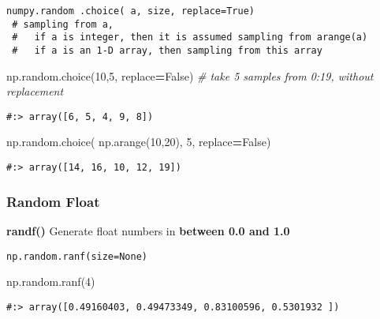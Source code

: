 \documentclass[
]{book}
\newenvironment{Shaded}{\begin{snugshade}}{\end{snugshade}}
\newcommand{\CommentTok}[1]{\textcolor[rgb]{0.37,0.37,0.37}{\textit{#1}}}
\newcommand{\DecValTok}[1]{\textcolor[rgb]{0.06,0.06,0.06}{#1}}
\newcommand{\NormalTok}[1]{#1}
\newcommand{\OperatorTok}[1]{\textcolor[rgb]{0.43,0.43,0.43}{\textbf{#1}}}
\newcommand{\VariableTok}[1]{\textcolor[rgb]{0,0,0}{#1}}
\begin{document}
\begin{verbatim}
numpy.random .choice( a, size, replace=True)
 # sampling from a, 
 #   if a is integer, then it is assumed sampling from arange(a)
 #   if a is an 1-D array, then sampling from this array
\end{verbatim}

\begin{Shaded}
\begin{Highlighting}[]
\NormalTok{np.random.choice(}\DecValTok{10}\NormalTok{,}\DecValTok{5}\NormalTok{, replace}\OperatorTok{=}\VariableTok{False}\NormalTok{) }\CommentTok{\# take 5 samples from 0:19, without replacement}
\end{Highlighting}
\end{Shaded}

\begin{verbatim}
#:> array([6, 5, 4, 9, 8])
\end{verbatim}

\begin{Shaded}
\begin{Highlighting}[]
\NormalTok{np.random.choice( np.arange(}\DecValTok{10}\NormalTok{,}\DecValTok{20}\NormalTok{), }\DecValTok{5}\NormalTok{, replace}\OperatorTok{=}\VariableTok{False}\NormalTok{)}
\end{Highlighting}
\end{Shaded}

\begin{verbatim}
#:> array([14, 16, 10, 12, 19])
\end{verbatim}

\hypertarget{random-float}{%
\subsubsection{Random Float}\label{random-float}}

\textbf{randf()} Generate float numbers in \textbf{between 0.0 and 1.0}

\begin{verbatim}
np.random.ranf(size=None)
\end{verbatim}

\begin{Shaded}
\begin{Highlighting}[]
\NormalTok{np.random.ranf(}\DecValTok{4}\NormalTok{)}
\end{Highlighting}
\end{Shaded}

\begin{verbatim}
#:> array([0.49160403, 0.49473349, 0.83100596, 0.5301932 ])
\end{verbatim}
\end{document}
